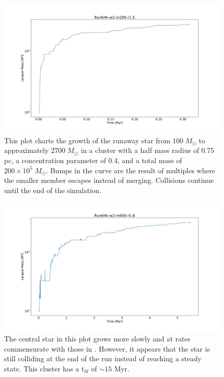\documentclass{princeton_astro_thesis}
\newcommand\Msun{\; M_\odot}
\newcommand\Myr{\mbox{ Myr}}
\numberwithin{equation}{section}
\begin{document}
\begin{figure}
\centering
\includegraphics[width=\textwidth]{MaxMassTime2-200-15}
\caption{This plot charts the growth of the runaway star from $100 \Msun$ to approximately $2700 \Msun$ in a cluster with a half mass radius of 0.75 pc, a concentration parameter of 0.4, and a total mass of $200 \times 10^5 \Msun$. Bumps in the curve are the result of multiples where the smaller member escapes instead of merging. Collisions continue until the end of the simulation.}
\label{fig:MaxMass2-200-1.5}
\end{figure}

\begin{figure}
\centering
\includegraphics[width=\textwidth]{MaxMassTime-2-600-58}
\caption{The central star in this plot grows more slowly and at rates commensurate with those in \citet{2004SPZ}.  However, it appears that the star is still colliding at the end of the run instead of reaching a steady state. This cluster has a $t_{\mathrm{df}}$ of $\sim 15 \Myr$.}
\label{fig:MaxMass2-600-5.8}
\end{figure}
\end{document}
